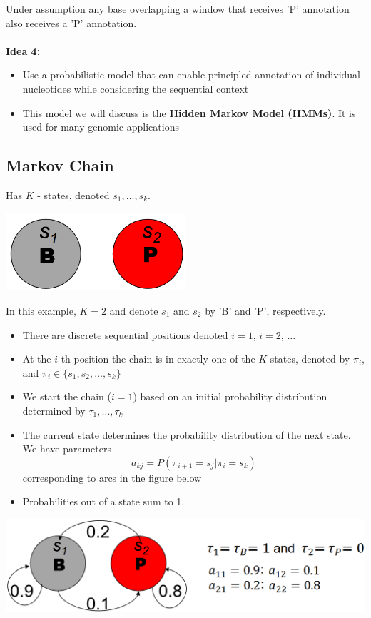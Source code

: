 \documentclass[10pt]{article}
\begin{document}
Under assumption any base overlapping a window that receives 'P' annotation also receives a 'P' annotation.\\\\
\textbf{Idea 4:}
\begin{itemize}
	\item Use a probabilistic model that can enable principled annotation of individual nucleotides while considering the sequential context
	\item This model we will discuss is the \textbf{Hidden Markov Model (HMMs)}.  It is used for many genomic applications
\end{itemize}

\subsection*{Markov Chain}
Has $K$ - states, denoted $s_1, \dots, s_k$.
\begin{center} 
	\includegraphics*[width=0.5\textwidth]{W9_10.png} 
\end{center}
In this example, $K = 2$ and denote $s_1$ and $s_2$ by 'B' and 'P', respectively.
\begin{itemize}
	\item There are discrete sequential positions denoted $i = 1$, $i = 2$, $\dots$
	\item At the $i$-th position the chain is in exactly one of the $K$ states, denoted by $\pi_i$, and $\pi_i \in \{s_1, s_2, \dots, s_k\}$
	\item We start the chain ($i = 1$) based on an initial probability distribution determined by $\tau_1, \dots, \tau_k$
	\item The current state determines the probability distribution of the next state.  We have parameters
	\[a_{kj} = P(\pi_{i + 1} = s_j | \pi_i = s_k)\]
    corresponding to arcs in the figure below
    \item Probabilities out of a state sum to 1.
\end{itemize}
\begin{center} 
	\includegraphics*[width=\textwidth]{W9_11.png} 
\end{center}
\end{document}
